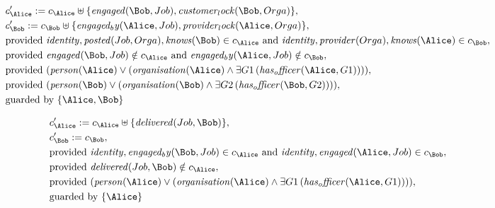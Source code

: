 \begin{align*}
&
c'_
{
\Alice
}
 := 
c_
{
\Alice
}
 \uplus 
\{
\mathit{
engaged
}
(
\Bob
,
Job
)
,
\mathit{
customer_lock
}
(
\Bob
,
Orga
)
\}
,\\
&
c'_
{
\Bob
}
 := 
c_
{
\Bob
}
 \uplus 
\{
\mathit{
engaged_by
}
(
\Alice
,
Job
)
,
\mathit{
provider_lock
}
(
\Alice
,
Orga
)
\}
,\\
&
\text{provided } 
\mathit{
identity
}
,
\mathit{
posted
}
(
Job
,
Orga
)
,
\mathit{
knows
}
(
\Bob
)
 \in c_
{
\Alice
}
 \text{ and } 
\mathit{
identity
}
,
\mathit{
provider
}
(
Orga
)
,
\mathit{
knows
}
(
\Alice
)
 \in c_
{
\Bob
}
,\\
&
\text{provided } 
\mathit{
engaged
}
(
\Bob
,
Job
)
 \notin c_
{
\Alice
}
 \text{ and } 
\mathit{
engaged_by
}
(
\Alice
,
Job
)
 \notin c_
{
\Bob
}
,\\
&
\text{provided } 
(
\mathit{
person
}
(
\Alice
)
\lor
(
\mathit{
organisation
}
(
\Alice
)
\land
\exists 
G1
\,(
\mathit{
has_officer
}
(
\Alice
,
G1
)
)
)
)
,\\
&
\text{provided } 
(
\mathit{
person
}
(
\Bob
)
\lor
(
\mathit{
organisation
}
(
\Bob
)
\land
\exists 
G2
\,(
\mathit{
has_officer
}
(
\Bob
,
G2
)
)
)
)
,\\
&
\text{guarded by } \{
\Alice
,
\Bob
\}
\end{align*}

\begin{align*}
&
c'_
{
\Alice
}
 := 
c_
{
\Alice
}
 \uplus 
\{
\mathit{
delivered
}
(
Job
,
\Bob
)
\}
,\\
&
c'_
{
\Bob
}
 := 
c_
{
\Bob
}
,\\
&
\text{provided } 
\mathit{
identity
}
,
\mathit{
engaged_by
}
(
\Bob
,
Job
)
 \in c_
{
\Alice
}
 \text{ and } 
\mathit{
identity
}
,
\mathit{
engaged
}
(
\Alice
,
Job
)
 \in c_
{
\Bob
}
,\\
&
\text{provided } 
\mathit{
delivered
}
(
Job
,
\Bob
)
 \notin c_
{
\Alice
}
,\\
&
\text{provided } 
(
\mathit{
person
}
(
\Alice
)
\lor
(
\mathit{
organisation
}
(
\Alice
)
\land
\exists 
G1
\,(
\mathit{
has_officer
}
(
\Alice
,
G1
)
)
)
)
,\\
&
\text{guarded by } \{
\Alice
\}
\end{align*}

